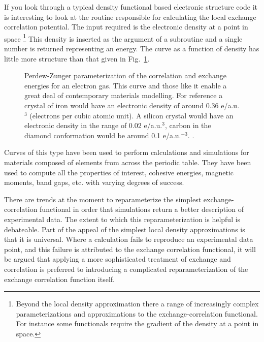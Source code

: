 If you look through a typical density functional based electronic structure code 
it is interesting to look at the routine responsible for calculating 
the local exchange correlation potential. 
The input required is the electronic density at a point in space \footnote{Beyond the local density
approximation there a range of increasingly complex parameterizations and
approximations to the exchange-correlation functional. For instance some functionals
require the gradient of the density at a point in space.} 
This  density is inserted as the argument of a subroutine and a single number is returned
representing an energy. The curve as a function of density 
has little more structure than that given in Fig.~\ref{fig:ldapz}. 
%
\begin{figure}
\begin{center}
\graphicspath{{./intro/}}
\caption{Perdew-Zunger parameterization of the correlation and exchange energies 
for an electron gas. This curve and those like it enable a great deal of 
contemporary materials modelling. For reference
a crystal of iron would have an electronic density of 
around 0.36 e/a.u.$^{3}$ (electrons per cubic
atomic unit). A silicon crystal would have an electronic density in the 
range of 0.02 e/a.u.$^{3}$, carbon in the diamond conformation 
would be around 0.1 e/a.u.$^{-3}$.  
\label{fig:ldapz}.}
\end{center}
\end{figure}
%
Curves of this type have been used to perform calculations and simulations for 
materials composed of elements from across the periodic table. They have been
used to compute all the properties of interest, cohesive energies, magnetic moments, 
band gaps, etc. with varying degrees of success.

There are trends at the moment to reparameterize the simplest exchange-correlation functional
in order that simulations return a better description of experimental data. The extent
to which this reparameterization is helpful is debateable. 
Part of the appeal of the simplest local density approximations is that it is universal. 
Where a calculation fails to reproduce an experimental data point, and this failure is 
attributed to the exchange correlation functional, it will be argued that 
applying a more sophisticated treatment of exchange and correlation is 
preferred to introducing a complicated reparameterization of the exchange correlation
function itself.

